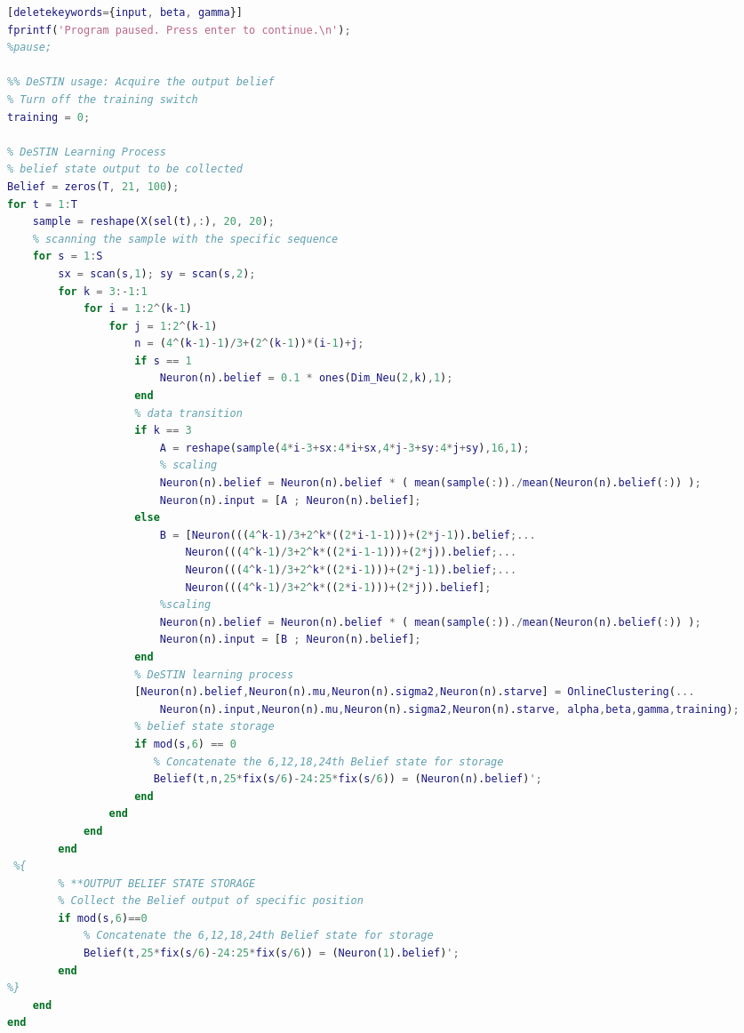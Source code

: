 \begin{spacing}{1}
\begin{lstlisting}[language=Matlab][deletekeywords={input, beta, gamma}]
fprintf('Program paused. Press enter to continue.\n');
%pause;

%% DeSTIN usage: Acquire the output belief
% Turn off the training switch
training = 0;

% DeSTIN Learning Process
% belief state output to be collected
Belief = zeros(T, 21, 100);
for t = 1:T
    sample = reshape(X(sel(t),:), 20, 20);
    % scanning the sample with the specific sequence
    for s = 1:S
        sx = scan(s,1); sy = scan(s,2);
        for k = 3:-1:1
            for i = 1:2^(k-1)
                for j = 1:2^(k-1)
                    n = (4^(k-1)-1)/3+(2^(k-1))*(i-1)+j;
                    if s == 1
                        Neuron(n).belief = 0.1 * ones(Dim_Neu(2,k),1);
                    end
                    % data transition
                    if k == 3
                        A = reshape(sample(4*i-3+sx:4*i+sx,4*j-3+sy:4*j+sy),16,1);
                        % scaling
                        Neuron(n).belief = Neuron(n).belief * ( mean(sample(:))./mean(Neuron(n).belief(:)) );
                        Neuron(n).input = [A ; Neuron(n).belief];
                    else
                        B = [Neuron(((4^k-1)/3+2^k*((2*i-1-1)))+(2*j-1)).belief;...
                            Neuron(((4^k-1)/3+2^k*((2*i-1-1)))+(2*j)).belief;...
                            Neuron(((4^k-1)/3+2^k*((2*i-1)))+(2*j-1)).belief;...
                            Neuron(((4^k-1)/3+2^k*((2*i-1)))+(2*j)).belief];
                        %scaling
                        Neuron(n).belief = Neuron(n).belief * ( mean(sample(:))./mean(Neuron(n).belief(:)) );
                        Neuron(n).input = [B ; Neuron(n).belief];
                    end
                    % DeSTIN learning process
                    [Neuron(n).belief,Neuron(n).mu,Neuron(n).sigma2,Neuron(n).starve] = OnlineClustering(...
                        Neuron(n).input,Neuron(n).mu,Neuron(n).sigma2,Neuron(n).starve, alpha,beta,gamma,training);
                    % belief state storage
                    if mod(s,6) == 0
                       % Concatenate the 6,12,18,24th Belief state for storage
                       Belief(t,n,25*fix(s/6)-24:25*fix(s/6)) = (Neuron(n).belief)';
                    end
                end
            end
        end
 %{
        % **OUTPUT BELIEF STATE STORAGE
        % Collect the Belief output of specific position
        if mod(s,6)==0
            % Concatenate the 6,12,18,24th Belief state for storage
            Belief(t,25*fix(s/6)-24:25*fix(s/6)) = (Neuron(1).belief)'; 
        end
%}
    end
end


\end{lstlisting}
\end{spacing}
